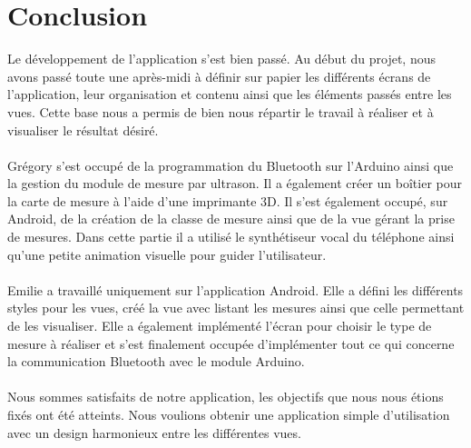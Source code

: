 \section{Conclusion}
Le développement de l'application s'est bien passé. Au début du projet, nous avons passé toute une après-midi à définir sur papier les différents écrans de l'application, leur organisation et contenu ainsi que les éléments passés entre les vues. Cette base nous a permis de bien nous répartir le travail à réaliser et à visualiser le résultat désiré.\\\\
Grégory s'est occupé de la programmation du Bluetooth sur l'Arduino ainsi que la gestion du module de mesure par ultrason. Il a également créer un boîtier pour la carte de mesure à l'aide d'une imprimante 3D. Il s'est également occupé, sur Android, de la création de la classe de mesure ainsi que de la vue gérant la prise de mesures. Dans cette partie il a utilisé le synthétiseur vocal du téléphone ainsi qu'une petite animation visuelle pour guider l'utilisateur.\\\\
Emilie a travaillé uniquement sur l'application Android. Elle a défini les différents styles pour les vues, créé la vue avec listant les mesures ainsi que celle permettant de les visualiser. Elle a également implémenté l'écran pour choisir le type de mesure à réaliser et s'est finalement occupée d'implémenter tout ce qui concerne la communication Bluetooth avec le module Arduino.\\\\
Nous sommes satisfaits de notre application, les objectifs que nous nous étions fixés ont été atteints. Nous voulions obtenir une application simple d'utilisation avec un design harmonieux entre les différentes vues. 



